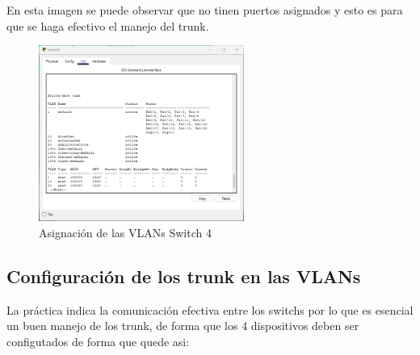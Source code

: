     En esta imagen se puede observar que no tinen puertos asignados y esto es para que se haga efectivo el manejo del trunk.
    \begin{figure}[H]
        \centering
        \includegraphics[width=0.6\textwidth]{img/vlansw4.png}
        \caption{Asignación de las VLANs Switch 4}
        \label{fig:swvla4}
    \end{figure}
    \subsection*{Configuración de los trunk en las VLANs}
    La práctica indica la comunicación efectiva entre los switchs por lo que es esencial un buen manejo de los trunk, de forma que los 4 dispositivos deben ser configutados de forma que quede asi:
    
